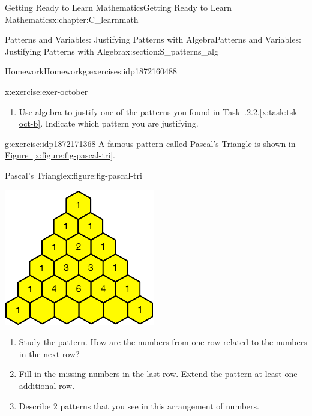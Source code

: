 \documentclass[oneside,10pt,]{book}
\newcommand{\xreffont}{\relax}
\numberwithin{equation}{chapter}
\begin{document}
\begin{chapterptx}{Getting Ready to Learn Mathematics}{}{Getting Ready to Learn Mathematics}{}{}{x:chapter:C_learnmath}
\begin{sectionptx}{Patterns and Variables: Justifying Patterns with Algebra}{}{Patterns and Variables: Justifying Patterns with Algebra}{}{}{x:section:S_patterns_alg}
\begin{exercises-subsection}{Homework}{}{Homework}{}{}{g:exercises:idp1872160488}
\begin{divisionexercise}{2}{}{}{x:exercise:exer-october}
\begin{enumerate}[font=\bfseries,label=(\alph*),ref=\alph*]
\item{}Use algebra to justify one of the patterns you found in \hyperref[x:task:tsk-oct-b]{Task~{\xreffont 1.8.2.2}.{\xreffont\ref{x:task:tsk-oct-b}}}. Indicate which pattern you are justifying.%
\end{enumerate}
\end{divisionexercise}%
\begin{divisionexercise}{3}{}{}{g:exercise:idp1872171368}%
A famous pattern called Pascal's Triangle is shown in \hyperref[x:figure:fig-pascal-tri]{Figure~{\xreffont\ref{x:figure:fig-pascal-tri}}}.%
\begin{figureptx}{Pascal's Triangle}{x:figure:fig-pascal-tri}{}%
\begin{image}{0.25}{0.5}{0.25}%
\includegraphics[width=\linewidth]{external/pascal-tri.pdf}
\end{image}%
\tcblower
\end{figureptx}%
\begin{enumerate}[font=\bfseries,label=(\alph*),ref=\alph*]
\item{}Study the pattern. How are the numbers from one row related to the numbers in the next row?%
\item{}Fill-in the missing numbers in the last row. Extend the pattern at least one additional row.%
\item{}Describe 2 patterns that you see in this arrangement of numbers.%
\end{enumerate}

\end{divisionexercise}
\end{exercises-subsection}
\end{sectionptx}
\end{chapterptx}
\end{document}

